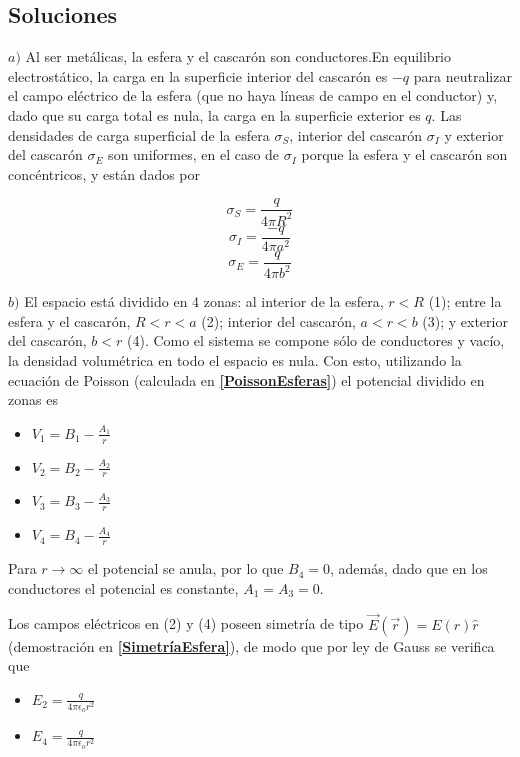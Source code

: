 \subsection{Soluciones}

\newline\newline
$a)$ Al ser metálicas, la esfera y el cascarón son conductores.En equilibrio electrostático, la carga en la superficie interior del cascarón es $-q$ para neutralizar el campo eléctrico de la esfera (que no haya líneas de campo en el conductor) y, dado que su carga total es nula, la carga en la superficie exterior es $q$. Las densidades de carga superficial de la esfera $\sigma_S$, interior del cascarón $\sigma_I$ y exterior del cascarón $\sigma_E$ son uniformes, en el caso de $\sigma_I$ porque la esfera y el cascarón son concéntricos, y están dados por

\[\sigma_S = \frac{q}{4\pi R^2}\]
\[\sigma_I = \frac{-q}{4\pi a^2}\]
\[\sigma_E = \frac{q}{4\pi b^2}\]

$b)$ El espacio está dividido en 4 zonas: al interior de la esfera, $r<R$ (1); entre la esfera y el cascarón, $R<r<a$ (2); interior del cascarón, $a<r<b$ (3); y exterior del cascarón, $b<r$ (4). Como el sistema se compone sólo de conductores y vacío, la densidad volumétrica en todo el espacio es nula. Con esto, utilizando la ecuación de Poisson (calculada en \textbf{\ref{PoissonEsferas}}) el potencial dividido en zonas es

\begin{itemize}
    \item $V_1 = B_1 - \frac{A_1}{r}$
    \item $V_2 = B_2 - \frac{A_2}{r}$
    \item $V_3 = B_3 - \frac{A_3}{r}$
    \item $V_4 = B_4 - \frac{A_4}{r}$
\end{itemize}

Para $r\rightarrow\infty$ el potencial se anula, por lo que $B_4 = 0$, además, dado que en los conductores el potencial es constante, $A_1 = A_3 = 0$.

Los campos eléctricos en (2) y (4) poseen simetría de tipo $\Vec{E}(\Vec{r}) = E(r)\hat{r}$ (demostración en \textbf{\ref{SimetríaEsfera}}), de modo que por ley de Gauss se verifica que

\begin{itemize}
    \item $E_2 = \frac{q}{4\pi\epsilon_o r^2}$
    \item $E_4 = \frac{q}{4\pi\epsilon_o r^2}$
\end{itemize}

